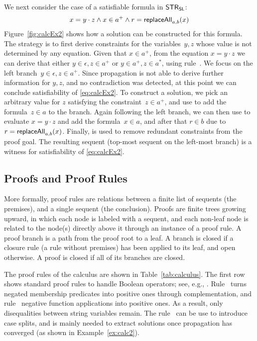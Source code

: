 \begin{example}
  \label{ex:calc2}
  We next consider the case of a satisfiable formula in $\mathsf{STR}_{\mathsf{SL}}$:
  \begin{equation}
    \label{eq:calcEx2}
    x = y \cdot z \wedge x \in a^+ \wedge r = \mathsf{replaceAll}_{a, b}(x)
  \end{equation}
  Figure~\ref{fig:calcEx2} shows how a solution can be constructed for
  this formula. The strategy is to first derive constraints for the
  variables~$y, z$ whose value is not determined by any
  equation. Given that $x \in a^+$, from the equation $x = y \cdot z$
  we can derive that either $y \in \epsilon, z \in a^+$ or
  $y \in a^+, z \in a^*$, using rule~. We focus on
  the left branch~$y \in \epsilon, z \in a^+$. Since propagation is
  not able to derive further information for $y, z$, and no
  contradiction was detected, at this point we can conclude
  satisfiability of \eqref{eq:calcEx2}. To construct a solution, we
  pick an arbitrary value for $z$ satisfying the
  constraint~$z \in a^+$, and use  to add the
  formula~$z \in a$ to the branch. Again following the left branch, we
  can then use  to evaluate $x = y\cdot z$ and
  add the formula~$x \in a$, and after that $r \in b$ due to
  $r = \mathsf{replaceAll}_{a, b}(x)$. Finally,  is used to
  remove redundant \regexp{} constraints from the proof goal. The
  resulting sequent (top-most sequent on the left-most branch) is a
  witness for satisfiability of \eqref{eq:calcEx2}.
\end{example}

\subsection{Proofs and Proof Rules}
\label{sec:rules}

More formally, proof rules are relations between a finite list of
sequents (the premises), and a single sequent (the conclusion). Proofs
are finite trees growing upward, in which each node is labeled with a
sequent, and each non-leaf node is related to the node(s) directly
above it through an instance of a proof rule. A proof branch is a path
from the proof root to a leaf. A branch is closed if a closure rule (a
rule without premises) has been applied to its leaf, and open
otherwise. A proof is closed if all of its branches are closed.

The proof rules of the calculus are shown in
Table~\ref{tab:calculus}. The first row shows standard proof rules to
handle Boolean operators; see, e.g.,
\cite{DBLP:books/daglib/0022394}. Rule~ turns
negated membership predicates into positive ones through
complementation, and rule~ negative function
applications into positive ones. As a result, only disequalities
between string variables remain. The rule~ can be use to
introduce case splits, and is mainly needed to extract solutions once
propagation has converged (as shown in Example~\ref{ex:calc2}).

